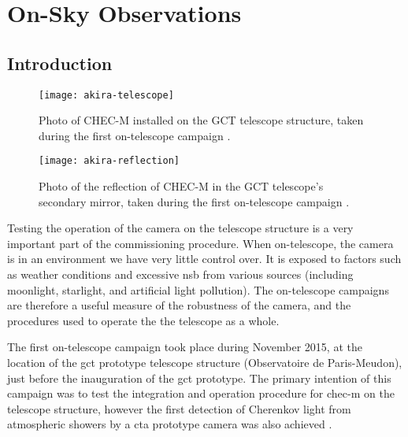 \chapter{\label{ch8-onsky}On-Sky Observations} 

\minitoc

\section{Introduction}

\begin{figure}
  \centering
  \texttt{[image: akira-telescope]}
  \caption[Photo of CHEC-M installed on the GCT telescope structure.]{Photo of CHEC-M installed on the GCT telescope structure, taken during the first on-telescope campaign \cite{akira-telescope}.}
  \label{fig:akira-telescope}
\end{figure}

\begin{figure}
  \centering
  \texttt{[image: akira-reflection]}
  \caption[Photo of the reflection of CHEC-M in the secondary mirror.]{Photo of the reflection of CHEC-M in the GCT telescope's secondary mirror, taken during the first on-telescope campaign \cite{akira-reflection}.}
  \label{fig:akira-reflection}
\end{figure}

Testing the operation of the camera on the telescope structure is a very important part of the commissioning procedure. When on-telescope, the camera is in an environment we have very little control over. It is exposed to factors such as weather conditions and excessive \gls{nsb} from various sources (including moonlight, starlight, and artificial light pollution). The on-telescope campaigns are therefore a useful measure of the robustness of the camera, and the procedures used to operate the the telescope as a whole.

The first on-telescope campaign took place during November 2015, at the location of the \gls{gct} prototype telescope structure (Observatoire de Paris-Meudon), just before the inauguration of the \gls{gct} prototype. The primary intention of this campaign was to test the integration and operation procedure for \gls{chec-m} on the telescope structure, however the first detection of Cherenkov light from atmospheric showers by a \gls{cta} prototype camera was also achieved \cite{Watson2017}. 

